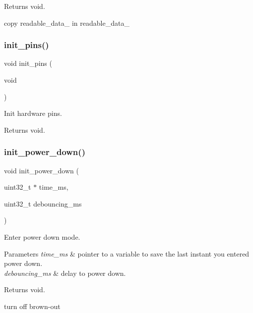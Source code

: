 \begin{DoxyReturn}{Returns}
void. 
\end{DoxyReturn}
copy readable\+\_\+data\+\_ in readable\+\_\+data\+\_ \mbox{\label{i2c-th_8ino_ad8b80a0c08f928106018edd6ea435b95}} 
\subsubsection{\texorpdfstring{init\+\_\+pins()}{init\_pins()}}
{\footnotesize\ttfamily void init\+\_\+pins (\begin{DoxyParamCaption}\item[{void}]{ }\end{DoxyParamCaption})}



Init hardware pins. 

\begin{DoxyReturn}{Returns}
void. 
\end{DoxyReturn}
\mbox{\label{i2c-th_8ino_afb98a0f07c30784284f48271ffe02b97}} 
\subsubsection{\texorpdfstring{init\+\_\+power\+\_\+down()}{init\_power\_down()}}
{\footnotesize\ttfamily void init\+\_\+power\+\_\+down (\begin{DoxyParamCaption}\item[{uint32\+\_\+t $\ast$}]{time\+\_\+ms,  }\item[{uint32\+\_\+t}]{debouncing\+\_\+ms }\end{DoxyParamCaption})}



Enter power down mode. 


\begin{DoxyParams}{Parameters}
{\em time\+\_\+ms} & pointer to a variable to save the last instant you entered power down. \\
\hline
{\em debouncing\+\_\+ms} & delay to power down. \\
\hline
\end{DoxyParams}
\begin{DoxyReturn}{Returns}
void. 
\end{DoxyReturn}
turn off brown-\/out \mbox{\label{i2c-th_8ino_ab985cc69f5f573113405b4f118c96d33}} 
